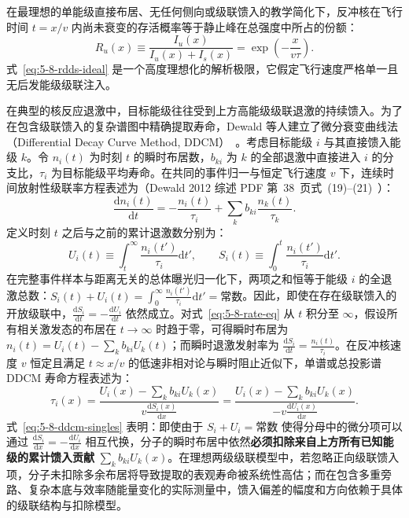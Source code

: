 在最理想的单能级直接布居、无任何侧向或级联馈入的教学简化下，反冲核在飞行时间 $t = x/v$ 内尚未衰变的存活概率等于静止峰在总强度中所占的份额：
\begin{equation}\label{eq:5-8-rdds-ideal}
R_u(x) \equiv \frac{I_u(x)}{I_u(x) + I_s(x)} = \exp\left( - \frac{x}{v \tau} \right).
\end{equation}
式~\eqref{eq:5-8-rdds-ideal} 是一个高度理想化的解析极限，它假定飞行速度严格单一且无后发能级级联注入。

在典型的核反应退激中，目标能级往往受到上方高能级级联退激的持续馈入。为了在包含级联馈入的复杂谱图中精确提取寿命，Dewald 等人建立了微分衰变曲线法（Differential Decay Curve Method, DDCM）~\cite{dewald-2012-ddcm-recoil-distance}。考虑目标能级 $i$ 与其直接馈入能级 $k$。令 $n_i(t)$ 为时刻 $t$ 的瞬时布居数，$b_{ki}$ 为 $k$ 的全部退激中直接进入 $i$ 的分支比，$\tau_i$ 为目标能级平均寿命。在共同的事件归一与恒定飞行速度 $v$ 下，连续时间放射性级联率方程表述为（Dewald 2012 综述 PDF 第~38~页式~(19)–(21)~\cite{dewald-2012-ddcm-recoil-distance}）：
\begin{equation}\label{eq:5-8-rate-eq}
\frac{\mathrm{d}n_i(t)}{\mathrm{d}t} = -\frac{n_i(t)}{\tau_i} + \sum_k b_{ki} \frac{n_k(t)}{\tau_k}.
\end{equation}
定义时刻 $t$ 之后与之前的累计退激数分别为：
\begin{equation}\label{eq:5-8-cum-counts-def}
U_i(t) \equiv \int_t^\infty \frac{n_i(t')}{\tau_i} \mathrm{d}t', \qquad S_i(t) \equiv \int_0^t \frac{n_i(t')}{\tau_i} \mathrm{d}t'.
\end{equation}
在完整事件样本与距离无关的总体曝光归一化下，两项之和恒等于能级 $i$ 的全退激总数：$S_i(t) + U_i(t) = \int_0^\infty \frac{n_i(t')}{\tau_i}\mathrm{d}t' = \text{常数}$。因此，即使在存在级联馈入的开放级联中，$\frac{\mathrm{d}S_i}{\mathrm{d}t} = -\frac{\mathrm{d}U_i}{\mathrm{d}t}$ 依然成立。对式~\eqref{eq:5-8-rate-eq} 从 $t$ 积分至 $\infty$，假设所有相关激发态的布居在 $t\to\infty$ 时趋于零，可得瞬时布居为 $n_i(t) = U_i(t) - \sum_k b_{ki} U_k(t)$；而瞬时退激发射率为 $\frac{\mathrm{d}S_i}{\mathrm{d}t} = \frac{n_i(t)}{\tau_i}$。在反冲核速度 $v$ 恒定且满足 $t \approx x/v$ 的低速非相对论与瞬时阻止近似下，单谱或总投影谱 DDCM 寿命方程表述为：
\begin{equation}\label{eq:5-8-ddcm-singles}
\tau_i(x) = \frac{U_i(x) - \sum_k b_{ki} U_k(x)}{v \frac{\mathrm{d} S_i(x)}{\mathrm{d}x}} = \frac{U_i(x) - \sum_k b_{ki} U_k(x)}{-v \frac{\mathrm{d} U_i(x)}{\mathrm{d}x}}.
\end{equation}
式~\eqref{eq:5-8-ddcm-singles} 表明：即使由于 $S_i + U_i = \text{常数}$ 使得分母中的微分项可以通过 $\frac{\mathrm{d}S_i}{\mathrm{d}x} = -\frac{\mathrm{d}U_i}{\mathrm{d}x}$ 相互代换，分子的瞬时布居中依然\textbf{必须扣除来自上方所有已知能级的累计馈入贡献} $\sum_k b_{ki} U_k(x)$。在理想两级级联模型中，若忽略正向级联馈入项，分子未扣除多余布居将导致提取的表观寿命被系统性高估；而在包含多重旁路、复杂本底与效率随能量变化的实际测量中，馈入偏差的幅度和方向依赖于具体的级联结构与扣除模型。

